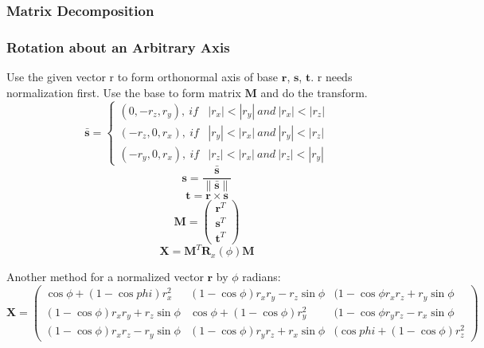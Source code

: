 \documentclass[10pt, a4paper]{article}
\begin{document}
            \subsubsection{Matrix Decomposition}
                \newpage
            \subsubsection{Rotation about an Arbitrary Axis} 
                Use the given vector $\text{r}$ to form orthonormal axis of base $\textbf{r}$, $\textbf{s}$, $\textbf{t}$. $\text{r}$ needs normalization first. Use the base to form matrix $\textbf{M}$ and do the transform.
                \begin{equation*} \bar{\textbf{s}} = 
                    \left\{
                    \begin{array}{lr}
                        (0, -r_z, r_y),\ if & |r_x| < |r_y|\  and\ |r_x| < |r_z| \\
                        (-r_z, 0, r_x),\ if & |r_y| < |r_x|\  and\ |r_y| < |r_z| \\
                        (-r_y, 0, r_x),\ if & |r_z| < |r_x|\  and\ |r_z| < |r_y| 
                    \end{array}
                    \right.
                \end{equation*} 
                $$\textbf{s} = \frac{\bar{\textbf{s}}}{\parallel{\bar{\textbf{s}}}\parallel} $$
                $$\textbf{t} = \textbf{r}\times\textbf{s}$$
                \begin{equation*}
                    \textbf{M} = 
                    \begin{pmatrix}
                        \textbf{r}^T \\
                        \textbf{s}^T \\
                        \textbf{t}^T
                    \end{pmatrix} 
                \end{equation*} 
                $$\textbf{X} = \textbf{M}^T\textbf{R}_{x}(\phi)\textbf{M}$$
                
                Another method for a normalized vector $\textbf{r}$ by $\phi$ radians: 
                \begin{equation*}
                    \textbf{X} = 
                    \begin{pmatrix}
                        \cos{\phi} + (1 - \cos{phi})r_x^2 & (1 - \cos{\phi})r_xr_y - r_z\sin{\phi} & (1 - \cos{\phi}r_xr_z + r_y\sin{\phi} \\
                        (1 - \cos{\phi})r_xr_y + r_z\sin{\phi} & \cos{\phi} + (1 - \cos{\phi})r_y^2 & (1 - \cos{\phi}r_yr_z - r_x\sin{\phi} \\
                        (1 - \cos{\phi})r_xr_z - r_y\sin{\phi} & (1 - \cos{\phi})r_yr_z + r_x\sin{\phi} & (\cos{phi} + (1 - \cos{\phi})r_z^2
                    \end{pmatrix}
                \end{equation*} 
                \newpage
        
\end{document}
